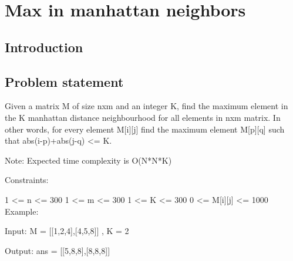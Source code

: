 %



\chapter{Max in manhattan neighbors}
\label{ch:max_manhattan}
\section*{Introduction}

\section{Problem statement}
\begin{exercise}
\label{example:max_manhattan:exercice1}
Given a matrix M of size nxm and an integer K, find the maximum element in the K manhattan distance neighbourhood for all elements in nxm matrix.
In other words, for every element M[i][j] find the maximum element M[p][q] such that abs(i-p)+abs(j-q) <= K.

Note: Expected time complexity is O(N*N*K)

Constraints:

1 <= n <= 300
1 <= m <= 300
1 <= K <= 300
0 <= M[i][j] <= 1000
Example:

Input:
M  = [[1,2,4],[4,5,8]] , K = 2

Output:
ans = [[5,8,8],[8,8,8]]

	\begin{example}
		\label{example:max_manhattan:example1}
		\hfill \
	}
		
	\end{example}

	\begin{example}
		\label{example:max_manhattan:example2}
		\hfill \
		
	\end{example}

	\begin{example}
		\hfill \
	
	\label{ex:max_manhattan:example1}
	\end{example}

	\begin{example}
		\hfill \

	\label{ex:max_manhattan:example2}	
	\end{example}
\end{exercise}

